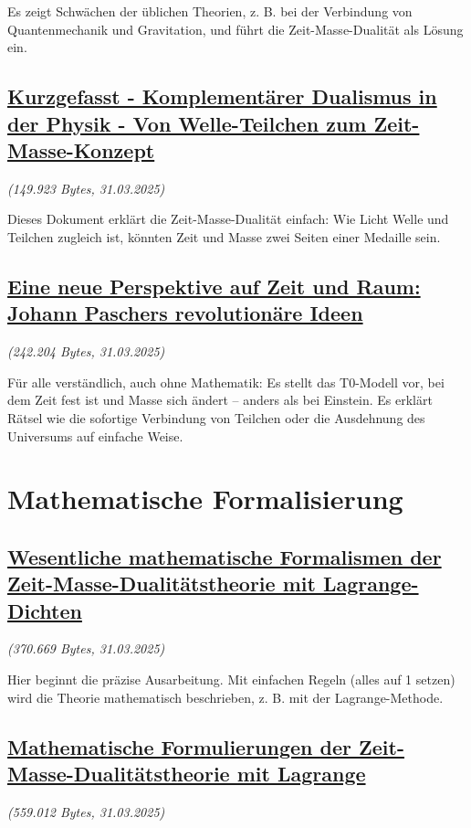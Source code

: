 \documentclass[a4paper,12pt]{article}
\newcommand{\repobase}{https://github.com/jpascher/T0-Time-Mass-Duality/tree/main/2/}
\begin{document}
	Es zeigt Schwächen der üblichen Theorien, z. B. bei der Verbindung von Quantenmechanik und Gravitation, und führt die Zeit-Masse-Dualität als Lösung ein.
	
	\subsection{\small\href{\repobase/pdf/Kurzgefasst - Komplementärer Dualismus in der Physik - Von Welle-Teilchen zum Zeit-Masse-Konzept.pdf}{Kurzgefasst - Komplementärer Dualismus in der Physik - Von Welle-Teilchen zum Zeit-Masse-Konzept}}
	\textit{(149.923 Bytes, 31.03.2025)}
	
	Dieses Dokument erklärt die Zeit-Masse-Dualität einfach: Wie Licht Welle und Teilchen zugleich ist, könnten Zeit und Masse zwei Seiten einer Medaille sein.
	
	\subsection{\small\href{\repobase/pdf/Deutsch/Eine neue Perspektive auf Zeit und Raum Johann Paschers revolutionäre Ideen.pdf}{Eine neue Perspektive auf Zeit und Raum: Johann Paschers revolutionäre Ideen}}
	\textit{(242.204 Bytes, 31.03.2025)}
	
	Für alle verständlich, auch ohne Mathematik: Es stellt das T0-Modell vor, bei dem Zeit fest ist und Masse sich ändert – anders als bei Einstein. Es erklärt Rätsel wie die sofortige Verbindung von Teilchen oder die Ausdehnung des Universums auf einfache Weise.
	
	\section{Mathematische Formalisierung}
	
	\subsection{\small\href{\repobase/pdf/Deutsch/Wesentliche mathematische Formalismen der Zeit-Masse-Dualitätstheorie mit Lagrange-Dichten.pdf}{Wesentliche mathematische Formalismen der Zeit-Masse-Dualitätstheorie mit Lagrange-Dichten}}
	\textit{(370.669 Bytes, 31.03.2025)}
	
	Hier beginnt die präzise Ausarbeitung. Mit einfachen Regeln (alles auf 1 setzen) wird die Theorie mathematisch beschrieben, z. B. mit der Lagrange-Methode.
	
	\subsection{\small\href{\repobase/pdf/Deutsch/Mathematische Formulierungen der Zeit-Masse-Dualitätstheorie mit Lagrange.pdf}{Mathematische Formulierungen der Zeit-Masse-Dualitätstheorie mit Lagrange}}
	\textit{(559.012 Bytes, 31.03.2025)}
	
\end{document}
